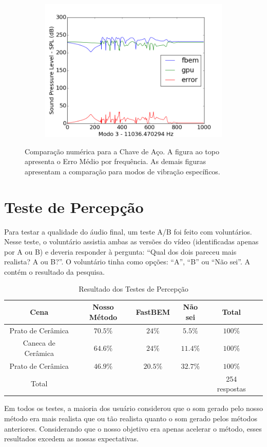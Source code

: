 \begin{figure}[ht]
\begin{subfigure}{0.45\textwidth}
	\includegraphics[width=\textwidth]{../data/transfer_test/steel_key/plots/steel_key-tfv-0_3.png}
	\caption{}
	\label{fig:coef_key_3}
\end{subfigure}
\caption[Comparação numérica para a Chave de Aço]{Comparação numérica para a Chave de Aço. A figura ao topo apresenta o Erro Médio por frequência. As demais figuras apresentam a comparação para modos de vibração específicos.}
\label{fig:coef_key}
\end{figure}

\section{Teste de Percepção}

Para testar a qualidade do áudio final, um teste A/B foi feito com voluntários. Nesse teste, o voluntário assistia ambas as versões do vídeo (identificadas apenas por A ou B) e deveria responder à pergunta: ``Qual dos dois pareceu mais realista? A ou B?''. O voluntário tinha como opções: ``A'', ``B'' ou ``Não sei''. A  contém o resultado da pesquisa.

\begin{table}[ht]
\begin{center}
\begin{tabular}{c|ccccc}
Cena & Nosso Método & FastBEM & Não sei & Total\\
\hline Prato de Cerâmica & $70.5\%$ & $24\%$ & $5.5\%$ & $100\%$\\
Caneca de Cerâmica & $64.6\%$ & $24\%$ & $11.4\%$ & $100\%$\\
Prato de Cerâmica & $46.9\%$ & $20.5\%$ & $32.7\%$ & $100\%$\\
Total & & & & 254 respostas
\end{tabular}
\end{center}
\caption{Resultado dos Testes de Percepção}\label{tab:survey_results}
\end{table}

Em todos os testes, a maioria dos usuário considerou que o som gerado pelo nosso método era mais realista que ou tão realista quanto o som gerado pelos métodos anteriores. Considerando que o nosso objetivo era apenas acelerar o método, esses resultados excedem as nossas expectativas.




